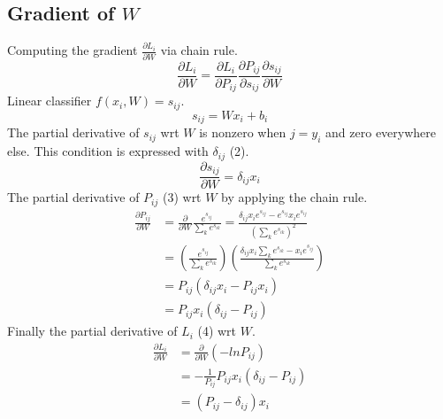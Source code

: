 \documentclass[12pt, letter]{article}
\begin{document}
{\subsection{Gradient of $W$}
Computing the gradient $\frac{\partial L_i}{\partial W}$ via chain rule.
\begin{equation}\nonumber
  \frac{\partial L_i}{\partial W} =
  \frac{\partial L_i}{\partial P_{ij}} \frac{\partial P_{ij}}{\partial s_{ij}} \frac{\partial s_{ij}}{\partial W}
\end{equation}
Linear classifier $f(x_i, W) = s_{ij}$.
\begin{equation}
  s_{ij} = Wx_i + b_i
\end{equation}
The partial derivative of $s_{ij}$ wrt $W$ is nonzero when $j=y_i$
and zero everywhere else. This condition is expressed with $\delta_{ij}$ (2).
\begin{equation}\nonumber
  \frac{\partial s_{ij}}{\partial W} = \delta_{ij} x_i
\end{equation}
The partial derivative of $P_{ij}$ (3) wrt $W$ by applying the chain rule.
\begin{equation}\nonumber
\begin{split}
  \frac{\partial P_{ij}}{\partial W}& = \frac{\partial}{\partial W}\frac{e^{s_{ij}}}{\sum_ke^{s_{ik}}} = \frac{\delta_{ij}x_ie^{s_{ij}}-e^{s_{ij}}x_ie^{s_{ij}}}{\left(\sum_ke^{s_{ik}}\right)^2}\\
  & = \left(\frac{e^{s_{ij}}}{\sum_ke^{s_{ik}}}\right)\left(\frac{\delta_{ij}x_i\sum_ke^{s_{ik}}-x_ie^{s_{ij}}}{\sum_ke^{s_{ik}}}\right)\\
  & = P_{ij} (\delta_{ij}x_i - P_{ij}x_i) \\
  & = P_{ij}x_i(\delta_{ij} - P_{ij})
\end{split}
\end{equation}
Finally the partial derivative of $L_i$ (4) wrt $W$.
\begin{equation}
\begin{split}
  \frac{\partial L_i}{\partial W}& = \frac{\partial}{\partial W}\left(-lnP_{ij}\right)\\
  & = -\frac{1}{P_{ij}} P_{ij}x_i(\delta_{ij} - P_{ij})\\
  & = (P_{ij} - \delta_{ij}) x_i
\end{split}
\end{equation}
\pagebreak
}
\end{document}
